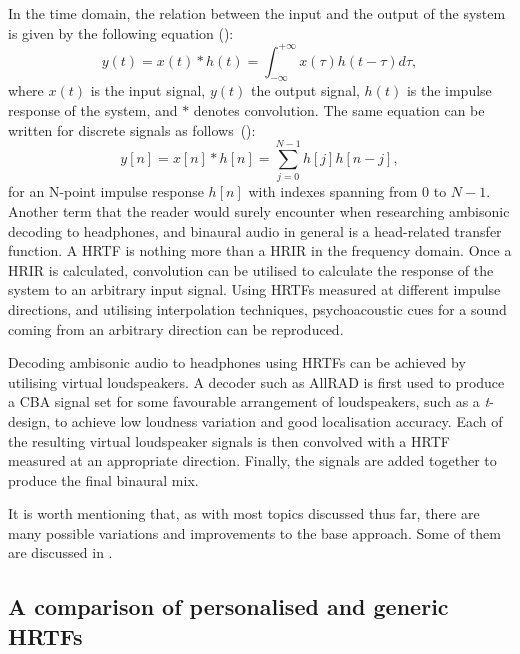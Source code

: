 In the time domain, the relation between the input and the output of the system is given by the following equation (\cite{dsp_book_convolution}):
\begin{equation}
    y(t) = x(t) * h(t) = \int_{-\infty}^{+\infty} x(\tau)h(t-\tau) d\tau,   
\end{equation}
where $x(t)$ is the input signal, $y(t)$ the output signal, $h(t)$ is the impulse response of the system, 
and $*$ denotes convolution. The same equation can be written for discrete signals as follows~(\cite{dsp_book_convolution}):
\begin{equation}
    y[n] = x[n] * h[n] = \sum_{j=0}^{N-1} h[j]h[n-j],
\end{equation}
for an N-point impulse response $h[n]$ with indexes spanning from $0$ to $N-1$.
Another term that the reader would surely encounter when researching ambisonic decoding to headphones,
and binaural audio in general is a head-related transfer function. A HRTF is nothing more than a HRIR 
in the frequency domain. \cite{fundamentals_of_binaural_technology} Once a HRIR is calculated, 
convolution can be utilised to calculate the response of the system to an arbitrary input signal.\cite{dsp_book_convolution}
Using HRTFs measured at different impulse directions, and utilising interpolation techniques, 
psychoacoustic cues for a sound coming from an arbitrary direction can be reproduced.\cite{hrtf_measurement_review}

Decoding ambisonic audio to headphones using HRTFs can be achieved by utilising virtual loudspeakers.
A decoder such as AllRAD is first used to produce a CBA signal set for some favourable arrangement of loudspeakers, such as a \emph{t}-design, to achieve low loudness variation and good localisation accuracy.
Each of the resulting virtual loudspeaker signals is then convolved with a HRTF measured at an appropriate direction.
Finally, the signals are added together to produce the final binaural mix. \cite{3d_ambisonic_based_binaural_reproduction}

It is worth mentioning that, as with most topics discussed thus far, there are many possible variations and improvements to the base approach. 
Some of them are discussed in \cite{ambisonics_practical_theory}.

\subsection{A comparison of personalised and generic HRTFs}


